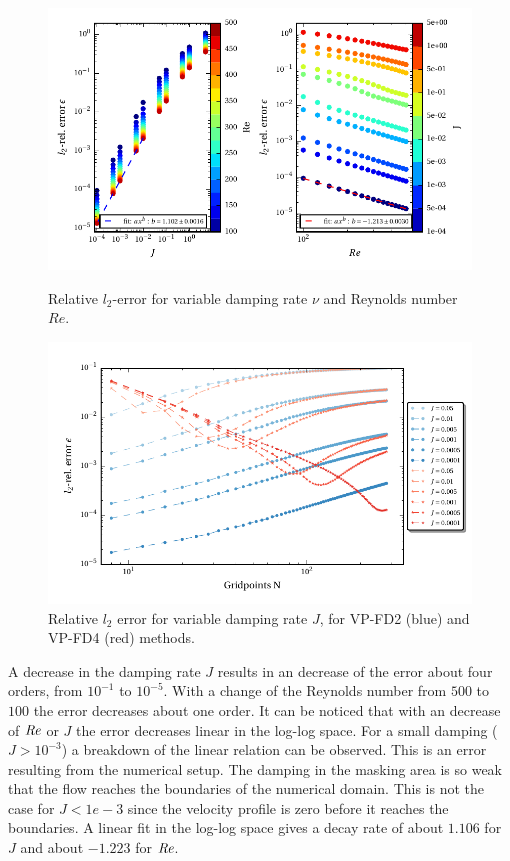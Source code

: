 \begin{figure}[!b]
  \centering
  \includegraphics{gfx/immersed_boundary/poiseuille_flow/2_vp/vp_error.pdf}  \caption{\label{fig:vp_error}
    Relative $l_2$-error for variable damping rate $\nu$ and Reynolds number $Re$.}
  \centering
  \includegraphics{gfx/immersed_boundary/poiseuille_flow/2_vp/vp_convergence.pdf}
  \caption{\label{fig:vp_conv}
      Relative $l_2$ error for variable damping rate $J$, for VP-FD2 (blue) and VP-FD4 (red) methods.}
\end{figure}


A decrease in the damping rate $J$ results in an decrease of the error about four orders, from $10^{-1}$ to $10^{-5}$.
With a change of the Reynolds number from $500$ to $100$ the error decreases about one order.
It can be noticed that with an decrease of $\mbox{\textit{Re}}$ or $J$ the error decreases linear in the log-log space.
For a small damping ($J>10^{-3}$) a breakdown of the linear relation can be observed.
This is an error resulting from the numerical setup.
The damping in the masking area is so weak that the flow reaches the  boundaries of the numerical domain.
This is not the case for $J<1e-3$ since the velocity profile is zero before it reaches the boundaries.
A linear fit in the log-log space gives a  decay rate of about $1.106$ for  $J$ and about $-1.223$ for $\mbox{\textit{Re}}$.

